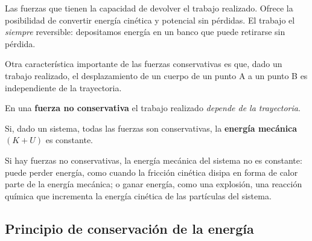 Las fuerzas que tienen la capacidad de devolver el trabajo realizado.
Ofrece la posibilidad de convertir energía cinética y potencial sin pérdidas.
El trabajo el \textit{siempre} reversible: 
depositamos energía en un banco que puede retirarse sin pérdida.

Otra característica importante de las fuerzas conservativas es que,
dado un trabajo realizado, 
el desplazamiento de un cuerpo de un punto A 
a un punto B es independiente de la trayectoria.

En una \textbf{fuerza no conservativa} el trabajo realizado 
\textit{depende de la trayectoria}.

Si, dado un sistema, todas las fuerzas son conservativas,
la \textbf{energía mecánica} \((K + U)\) es constante.

Si hay fuerzas no conservativas, la energía mecánica del sistema no es constante:
puede perder energía, 
como cuando la fricción cinética disipa en forma de calor parte de la energía 
mecánica;
o ganar energía, como una explosión,
una reacción química que incrementa la energía cinética de las partículas del 
sistema.

\subsection{Principio de conservación de la energía}

